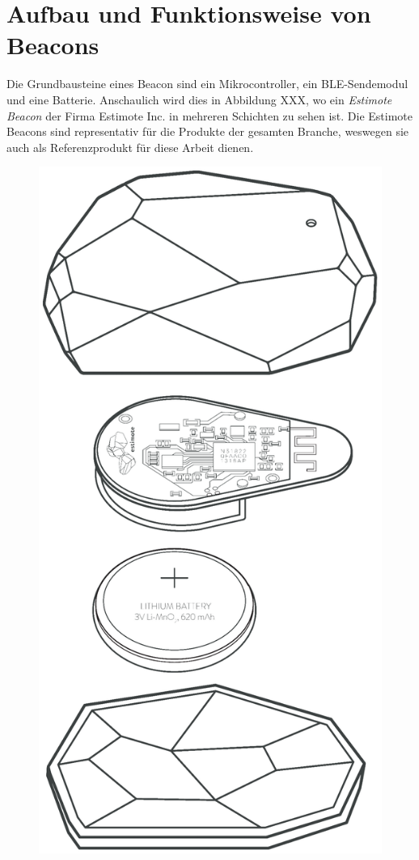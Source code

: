 \section{Aufbau und Funktionsweise von Beacons}
Die Grundbausteine eines Beacon sind ein Mikrocontroller, ein BLE-Sendemodul und eine Batterie. Anschaulich wird dies in Abbildung XXX, wo ein \textit{Estimote Beacon} der Firma Estimote Inc. in mehreren Schichten zu sehen ist. Die Estimote Beacons sind representativ für die Produkte der gesamten Branche, weswegen sie auch als Referenzprodukt für diese Arbeit dienen. 
\begin{figure}
\begin{flushright}
\includegraphics[scale=0.07]{Bilder/BeaconSchicht.png}

\end{flushright}
\end{figure}
